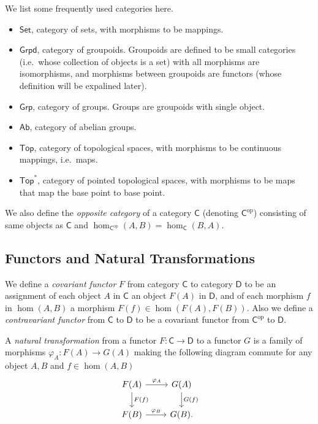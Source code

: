 \documentclass[a4paper]{amsart}
\theoremstyle{plain}
\theoremstyle{definition}
\theoremstyle{remark}
\begin{document}
We list some frequently used categories here.
\begin{itemize}
    \item $\mathsf{Set}$, category of sets, with morphisms to be mappings.
    \item $\mathsf{Grpd}$, category of groupoids.
    Groupoids are defined to be small categories (i.e.\ whose collection of objects is a set) with all morphisms are isomorphisms, and morphisms between groupoids are functors (whose definition will be expalined later).
    \item $\mathsf{Grp}$, category of groups.
    Groups are groupoids with single object.
    \item $\mathsf{Ab}$, category of abelian groups.
    \item $\mathsf{Top}$, category of topological spaces, with morphisms to be continuous mappings, i.e.\ maps.
    \item $\mathsf{Top}^*$, category of pointed topological spaces, with morphisms to be maps that map the base point to base point.
\end{itemize}

We also define the \emph{opposite category} of a category $\mathsf{C}$ (denoting $\mathsf{C}^{\mathrm{op}}$) consisting of same objects as $\mathsf{C}$ and $\hom_{\mathsf{C}^{\mathrm{op}}}(A,B)=\hom_\mathsf{C}(B,A)$.

\subsection{Functors and Natural Transformations}

We define a \emph{covariant functor} $F$ from category $\mathsf{C}$ to category $\mathsf{D}$ to be an assignment of each object $A$ in $\mathsf{C}$ an object $F(A)$ in $\mathsf{D}$, and of each morphism $f$ in $\hom(A,B)$ a morphism $F(f)\in\hom(F(A),F(B))$.
Also we define a \emph{contravariant functor} from $\mathsf{C}$ to $\mathsf{D}$ to be a covariant functor from $\mathsf{C}^{\mathrm{op}}$ to $\mathsf{D}$.

A \emph{natural transformation} from a functor $F:\mathsf{C}\to\mathsf{D}$ to a functor $G$ is a family of morphisms $\varphi_A:F(A)\to G(A)$ making the following diagram commute for any object $A,B$ and $f\in\hom(A,B)$
\[\begin{tikzcd}
    F(A) \ar[r, "{\varphi_A}"] \ar[d, "F(f)"] & G(A) \ar[d, "{G(f)}"] \\
    F(B) \ar[r, "{\varphi_B}"] & G(B).
\end{tikzcd}\]
\end{document}
